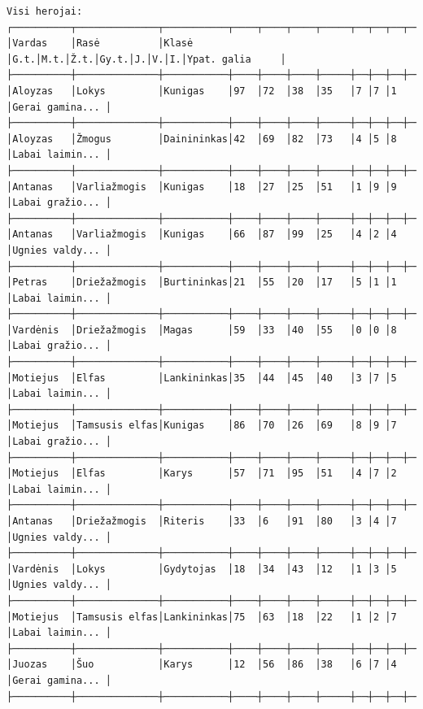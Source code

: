 \documentclass{article}
\begin{document}
\footnotesize
\begin{verbatim}
Visi herojai:
┌──────────┬──────────────┬───────────┬────┬────┬────┬─────┬──┬──┬──┬────────────────┐
│Vardas    │Rasė          │Klasė      │G.t.│M.t.│Ž.t.│Gy.t.│J.│V.│I.│Ypat. galia     │
├──────────┼──────────────┼───────────┼────┼────┼────┼─────┼──┼──┼──┼────────────────┤
│Aloyzas   │Lokys         │Kunigas    │97  │72  │38  │35   │7 │7 │1 │Gerai gamina... │
├──────────┼──────────────┼───────────┼────┼────┼────┼─────┼──┼──┼──┼────────────────┤
│Aloyzas   │Žmogus        │Dainininkas│42  │69  │82  │73   │4 │5 │8 │Labai laimin... │
├──────────┼──────────────┼───────────┼────┼────┼────┼─────┼──┼──┼──┼────────────────┤
│Antanas   │Varliažmogis  │Kunigas    │18  │27  │25  │51   │1 │9 │9 │Labai gražio... │
├──────────┼──────────────┼───────────┼────┼────┼────┼─────┼──┼──┼──┼────────────────┤
│Antanas   │Varliažmogis  │Kunigas    │66  │87  │99  │25   │4 │2 │4 │Ugnies valdy... │
├──────────┼──────────────┼───────────┼────┼────┼────┼─────┼──┼──┼──┼────────────────┤
│Petras    │Driežažmogis  │Burtininkas│21  │55  │20  │17   │5 │1 │1 │Labai laimin... │
├──────────┼──────────────┼───────────┼────┼────┼────┼─────┼──┼──┼──┼────────────────┤
│Vardėnis  │Driežažmogis  │Magas      │59  │33  │40  │55   │0 │0 │8 │Labai gražio... │
├──────────┼──────────────┼───────────┼────┼────┼────┼─────┼──┼──┼──┼────────────────┤
│Motiejus  │Elfas         │Lankininkas│35  │44  │45  │40   │3 │7 │5 │Labai laimin... │
├──────────┼──────────────┼───────────┼────┼────┼────┼─────┼──┼──┼──┼────────────────┤
│Motiejus  │Tamsusis elfas│Kunigas    │86  │70  │26  │69   │8 │9 │7 │Labai gražio... │
├──────────┼──────────────┼───────────┼────┼────┼────┼─────┼──┼──┼──┼────────────────┤
│Motiejus  │Elfas         │Karys      │57  │71  │95  │51   │4 │7 │2 │Labai laimin... │
├──────────┼──────────────┼───────────┼────┼────┼────┼─────┼──┼──┼──┼────────────────┤
│Antanas   │Driežažmogis  │Riteris    │33  │6   │91  │80   │3 │4 │7 │Ugnies valdy... │
├──────────┼──────────────┼───────────┼────┼────┼────┼─────┼──┼──┼──┼────────────────┤
│Vardėnis  │Lokys         │Gydytojas  │18  │34  │43  │12   │1 │3 │5 │Ugnies valdy... │
├──────────┼──────────────┼───────────┼────┼────┼────┼─────┼──┼──┼──┼────────────────┤
│Motiejus  │Tamsusis elfas│Lankininkas│75  │63  │18  │22   │1 │2 │7 │Labai laimin... │
├──────────┼──────────────┼───────────┼────┼────┼────┼─────┼──┼──┼──┼────────────────┤
│Juozas    │Šuo           │Karys      │12  │56  │86  │38   │6 │7 │4 │Gerai gamina... │
├──────────┼──────────────┼───────────┼────┼────┼────┼─────┼──┼──┼──┼────────────────┤

\end{verbatim}
\end{document}
